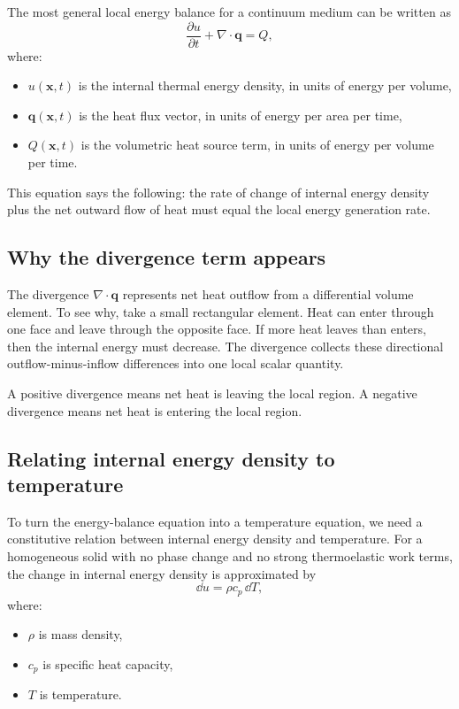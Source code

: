 \documentclass[11pt]{article}
\newcommand{\qvec}{\mathbf{q}}
\newcommand{\xvec}{\mathbf{x}}
\begin{document}
The most general local energy balance for a continuum medium can be written as
\[
\frac{\partial u}{\partial t} + \nabla \cdot \qvec = Q,
\]
where:
\begin{itemize}
    \item $u(\xvec,t)$ is the internal thermal energy density, in units of energy per volume,
    \item $\qvec(\xvec,t)$ is the heat flux vector, in units of energy per area per time,
    \item $Q(\xvec,t)$ is the volumetric heat source term, in units of energy per volume per time.
\end{itemize}

This equation says the following: the rate of change of internal energy density plus the net outward flow of heat must equal the local energy generation rate.

\subsection{Why the divergence term appears}

The divergence $\nabla \cdot \qvec$ represents net heat outflow from a differential volume element. To see why, take a small rectangular element. Heat can enter through one face and leave through the opposite face. If more heat leaves than enters, then the internal energy must decrease. The divergence collects these directional outflow-minus-inflow differences into one local scalar quantity.

A positive divergence means net heat is leaving the local region. A negative divergence means net heat is entering the local region.

\subsection{Relating internal energy density to temperature}

To turn the energy-balance equation into a temperature equation, we need a constitutive relation between internal energy density and temperature. For a homogeneous solid with no phase change and no strong thermoelastic work terms, the change in internal energy density is approximated by
\[
\dd u = \rho c_p \, \dd T,
\]
where:
\begin{itemize}
    \item $\rho$ is mass density,
    \item $c_p$ is specific heat capacity,
    \item $T$ is temperature.
\end{itemize}
\end{document}
